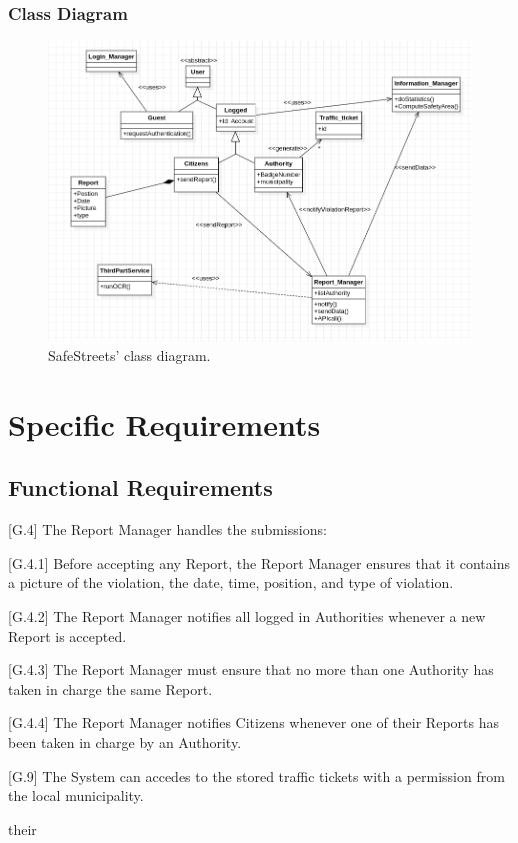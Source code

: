 \documentclass{report}
\begin{document}
\subsection{Class Diagram}
\begin{figure}[h!]
\begin{center}

\includegraphics[scale=0.4]{./img/SWE1.png}
\end{center}
\caption{SafeStreets' class diagram.}
\label{schema}
\end{figure} 
\chapter{Specific Requirements}
\section{Functional Requirements}
\begin{itemize}
\item {[G.4]} The Report Manager handles the submissions:
    {\setlength\itemindent{25pt} \item {[G.4.1]} Before accepting any Report, the Report Manager ensures that it contains a picture of the violation, the date, time, position, and type of violation.}
    {\setlength\itemindent{25pt} \item {[G.4.2]} The Report Manager notifies all logged in Authorities whenever a new Report is accepted.}
    {\setlength\itemindent{25pt} \item {[G.4.3]} The Report Manager must ensure that no more than one Authority has taken in charge the same Report.}
    {\setlength\itemindent{25pt} \item {[G.4.4]} The Report Manager notifies Citizens whenever one of their Reports has been taken in charge by an Authority.}
\item {[G.9]} The System can accedes to the stored traffic tickets with a permission from the local municipality.
\end{itemize}their
\end{document}

